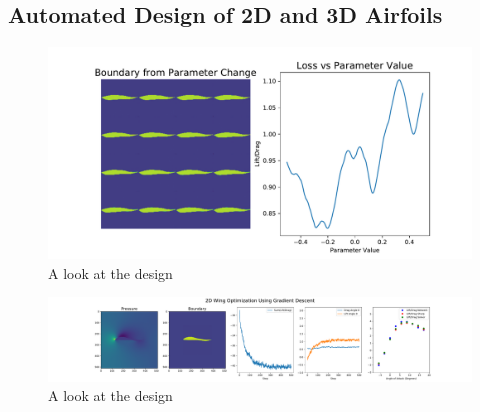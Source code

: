 \documentclass{article} %
\begin{document}
\subsection{Automated Design of 2D and 3D Airfoils}

\begin{figure}[h]
\begin{center}
\includegraphics[scale=0.27]{../test/figs/boundary_space_explore.pdf}
\end{center}
\caption{A look at the design }
\end{figure}

\begin{figure}[h]
\begin{center}
\includegraphics[scale=0.27]{../test/figs/learn_gradient_descent.pdf}
\end{center}
\caption{A look at the design }
\end{figure}
\end{document}
